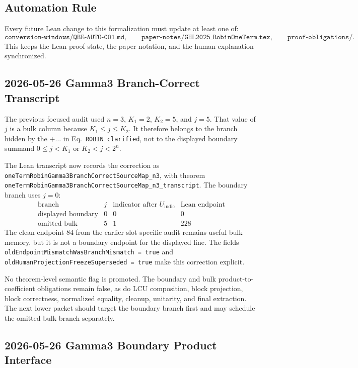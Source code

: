 \subsection{Automation Rule}

Every future Lean change to this formalization must update at least one of:
\[
  \texttt{conversion-windows/QBE-AUTO-001.md},
  \qquad
  \texttt{paper-notes/GHL2025\_RobinOneTerm.tex},
  \qquad
  \texttt{proof-obligations/}.
\]
This keeps the Lean proof state, the paper notation, and the human explanation
synchronized.

\subsection{2026-05-26 Gamma3 Branch-Correct Transcript}

The previous focused audit used \(n=3\), \(K_1=2\), \(K_2=5\), and \(j=5\).
That value of \(j\) is a bulk column because \(K_1 \leq j \leq K_2\).  It
therefore belongs to the branch hidden by the \(+\dots\) in
Eq.~\texttt{ROBIN clarified}, not to the displayed boundary summand
\(0 \leq j < K_1\) or \(K_2 < j < 2^n\).

The Lean transcript now records the correction as
\texttt{oneTermRobinGamma3BranchCorrectSourceMap\_n3}, with theorem
\texttt{oneTermRobinGamma3BranchCorrectSourceMap\_n3\_transcript}.  The
boundary branch uses \(j=0\):
\[
\begin{array}{c|ccc}
\text{branch} & j & \text{indicator after }U_{\mathrm{indic}} & \text{Lean endpoint} \\
\hline
\text{displayed boundary} & 0 & 0 & 0 \\
\text{omitted bulk} & 5 & 1 & 228
\end{array}
\]
The clean endpoint \(84\) from the earlier slot-specific audit remains useful
bulk memory, but it is not a boundary endpoint for the displayed line.  The
fields
\texttt{oldEndpointMismatchWasBranchMismatch = true} and
\texttt{oldHumanProjectionFreezeSuperseded = true} make this correction
explicit.

No theorem-level semantic flag is promoted.  The boundary and bulk
product-to-coefficient obligations remain false, as do LCU composition, block
projection, block correctness, normalized equality, cleanup, unitarity, and
final extraction.  The next lower packet should target the boundary branch
first and may schedule the omitted bulk branch separately.

\subsection{2026-05-26 Gamma3 Boundary Product Interface}

